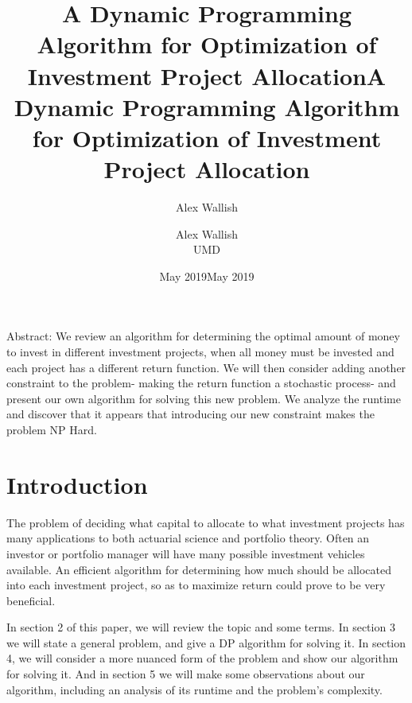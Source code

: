 \documentclass{article}
\title{A Dynamic Programming Algorithm for Optimization of Investment Project Allocation}
\author{Alex Wallish}
\date{May 2019}
\title{A Dynamic Programming Algorithm for Optimization of Investment Project Allocation}
\date{May 2019}
\author{Alex Wallish\\ UMD}
\begin{document}
\maketitle


\vspace*{100px}
Abstract: 
We review an algorithm for determining the optimal amount of money to invest in different investment projects, when all money must be invested and each project has a different return function.  We will then consider adding another constraint to the problem- making the return function a stochastic process- and present our own algorithm for solving this new problem.  We analyze the runtime and discover that it appears that introducing our new constraint makes the problem NP Hard.  




\pagebreak
\section{Introduction}
The problem of deciding what capital to allocate to what investment projects has many applications to both actuarial science and portfolio theory.  Often an investor or portfolio manager will have many possible investment vehicles available. An efficient algorithm for determining how much should be allocated into each investment project, so as to maximize return could prove to be very beneficial. 
\par
In section 2 of this paper, we will review the topic and some terms. In section 3 we will state a general problem, and give a DP algorithm for solving it.  In section 4, we will consider a more nuanced form of the problem and show our algorithm for solving it. And in section 5 we will make some observations about our algorithm, including an analysis of its runtime and the problem's complexity. 
\end{document}

